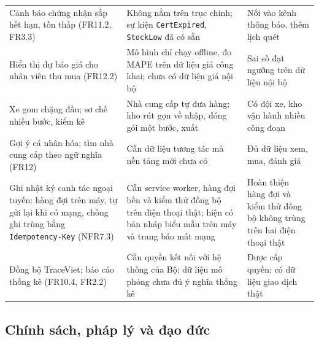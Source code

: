 \begin{longtable}{L{4.40cm} L{6.40cm} L{4.10cm}}
Cảnh báo chứng nhận sắp hết hạn, tồn thấp (FR11.2, FR3.3) & Không nằm trên trục chính; sự kiện \texttt{CertExpired}, \texttt{StockLow} đã có sẵn & Nối vào kênh thông báo, thêm lịch quét \\
Hiển thị dự báo giá cho nhân viên thu mua (FR12.2) & Mô hình chỉ chạy offline, đo MAPE trên dữ liệu giá công khai; chưa có dữ liệu giá nội bộ & Sai số đạt ngưỡng trên dữ liệu nội bộ \\
Xe gom chặng đầu; sơ chế nhiều bước, kiểm kê & Nhà cung cấp tự đưa hàng; kho rút gọn về nhập, đóng gói một bước, xuất & Có đội xe, kho vận hành nhiều công đoạn \\
Gợi ý cá nhân hóa; tìm nhà cung cấp theo ngữ nghĩa (FR12) & Cần dữ liệu tương tác mà nền tảng mới chưa có & Đủ dữ liệu xem, mua, đánh giá \\
Ghi nhật ký canh tác ngoại tuyến: hàng đợi trên máy, tự gửi lại khi có mạng, chống ghi trùng bằng \texttt{Idempotency-Key} (NFR7.3) & Cần service worker, hàng đợi bền và kiểm thử đồng bộ trên điện thoại thật; hiện có bản nháp biểu mẫu trên máy và trang báo mất mạng & Hoàn thiện hàng đợi và kiểm thử đồng bộ không trùng trên hai điện thoại thật \\
Đồng bộ TraceViet; báo cáo thống kê (FR10.4, FR2.2) & Cần quyền kết nối với hệ thống của Bộ; dữ liệu mô phỏng chưa đủ ý nghĩa thống kê & Được cấp quyền; có dữ liệu giao dịch thật \\
\end{longtable}
\endgroup

\subsection{Chính sách, pháp lý và đạo đức}
\label{subsec:chinhsach}

